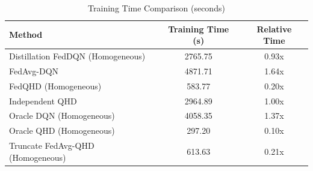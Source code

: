 \begin{table}[t]
\centering
\caption{Training Time Comparison (seconds)}
\label{tab:computation_cost}
\begin{tabular}{lcc}
\toprule
Method & Training Time (s) & Relative Time \\
\midrule
Distillation FedDQN (Homogeneous) & 2765.75 & 0.93x \\
FedAvg-DQN & 4871.71 & 1.64x \\
FedQHD (Homogeneous) & 583.77 & 0.20x \\
Independent QHD & 2964.89 & 1.00x \\
Oracle DQN (Homogeneous) & 4058.35 & 1.37x \\
Oracle QHD (Homogeneous) & 297.20 & 0.10x \\
Truncate FedAvg-QHD (Homogeneous) & 613.63 & 0.21x \\
\bottomrule
\end{tabular}
\end{table}